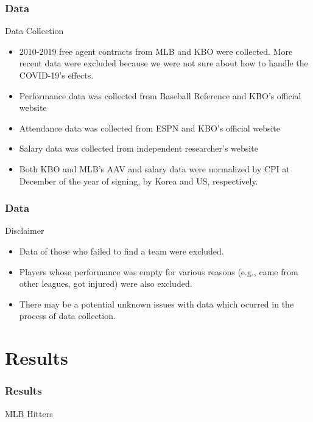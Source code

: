 \documentclass[9pt]{beamer}
\begin{document}
\begin{frame}
    \frametitle{Data}
    \begin{block}
        {Data Collection}
        \begin{itemize}
            \item 2010-2019 free agent contracts from MLB and KBO were collected. More recent data were excluded because we were not sure about how to handle the COVID-19's effects.
            \item Performance data was collected from Baseball Reference and KBO's official website
            \item Attendance data was collected from ESPN and KBO's official website
            \item Salary data was collected from independent researcher's website
            \item Both KBO and MLB's AAV and salary data were normalized by CPI at December of the year of signing, by Korea and US, respectively.
        \end{itemize}
    \end{block}
\end{frame}

\begin{frame}
    \frametitle{Data}
    \begin{block}{Disclaimer}
        \begin{itemize}
            \item Data of those who failed to find a team were excluded.
            \item Players whose performance was empty for various reasons (e.g., came from other leagues, got injured) were also excluded.
            \item There may be a potential unknown issues with data which ocurred in the process of data collection.
        \end{itemize}
    \end{block}
\end{frame}

\section{Results}
\begin{frame}
    \frametitle{Results}
    \begin{block}{MLB Hitters}
        
    \end{block}
\end{frame}
\end{document}
